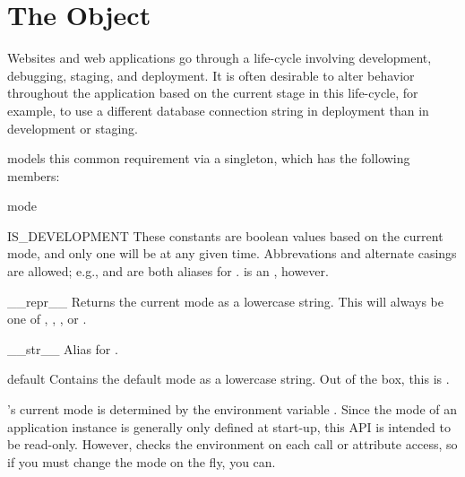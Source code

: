 \section{The  Object}

Websites and web applications go through a life-cycle involving development,
debugging, staging, and deployment. It is often desirable to alter behavior
throughout the application based on the current stage in this life-cycle, for
example, to use a different database connection string in deployment than in
development or staging.

 models this common requirement via a  singleton,
which has the following members:

\begin{classdesc*}{mode}

\begin{memberdesc}{IS_DEVELOPMENT}
    These constants are boolean values based on the current mode, and only one
    will be  at any given time. Abbrevations and alternate casings
    are allowed; e.g.,  and  are both
    aliases for .  is an
    , however.
\end{memberdesc}

\begin{methoddesc}{__repr__}{}
    Returns the current mode as a lowercase string. This will always be one of
    , , , or .
\end{methoddesc}

\begin{methoddesc}{__str__}{}
    Alias for .
\end{methoddesc}

\begin{memberdesc}{default}
    Contains the default mode as a lowercase string. Out of the box, this is
    .
\end{memberdesc}

\end{classdesc*}


's current mode is determined by the environment variable
. Since the mode of an application instance is generally only
defined at start-up, this API is intended to be read-only. However, 
checks the environment on each call or attribute access, so if you must change
the mode on the fly, you can.

